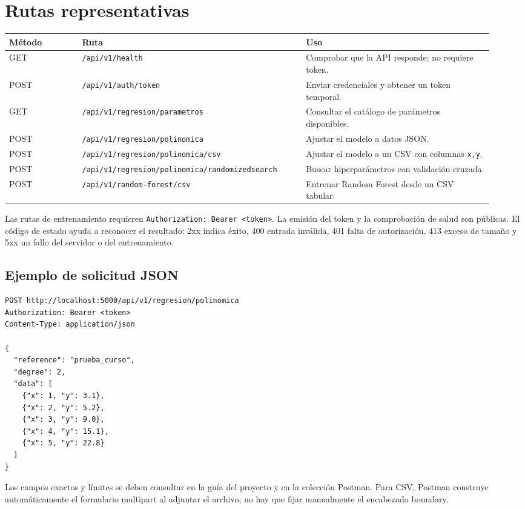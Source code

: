 \documentclass[11pt,a4paper]{article}
\begin{document}
\section{Rutas representativas}
\begin{longtable}{p{0.14\linewidth}p{0.43\linewidth}p{0.36\linewidth}}
\toprule Método & Ruta & Uso\\\midrule
GET & \texttt{/api/v1/health} & Comprobar que la API responde; no requiere token.\\
POST & \texttt{/api/v1/auth/token} & Enviar credenciales y obtener un token temporal.\\
GET & \texttt{/api/v1/regresion/parametros} & Consultar el catálogo de parámetros disponibles.\\
POST & \texttt{/api/v1/regresion/polinomica} & Ajustar el modelo a datos JSON.\\
POST & \texttt{/api/v1/regresion/polinomica/csv} & Ajustar el modelo a un CSV con columnas \texttt{x,y}.\\
POST & \texttt{/api/v1/regresion/polinomica/randomizedsearch} & Buscar hiperparámetros con validación cruzada.\\
POST & \texttt{/api/v1/random-forest/csv} & Entrenar Random Forest desde un CSV tabular.\\
\bottomrule
\end{longtable}
Las rutas de entrenamiento requieren \texttt{Authorization: Bearer <token>}. La emisión del token y la comprobación de salud son públicas. El código de estado ayuda a reconocer el resultado: 2xx indica éxito, 400 entrada inválida, 401 falta de autorización, 413 exceso de tamaño y 5xx un fallo del servidor o del entrenamiento.

\subsection{Ejemplo de solicitud JSON}
\begin{lstlisting}
POST http://localhost:5000/api/v1/regresion/polinomica
Authorization: Bearer <token>
Content-Type: application/json

{
  "reference": "prueba_curso",
  "degree": 2,
  "data": [
    {"x": 1, "y": 3.1},
    {"x": 2, "y": 5.2},
    {"x": 3, "y": 9.0},
    {"x": 4, "y": 15.1},
    {"x": 5, "y": 22.8}
  ]
}
\end{lstlisting}
Los campos exactos y límites se deben consultar en la guía del proyecto y en la colección Postman. Para CSV, Postman construye automáticamente el formulario multipart al adjuntar el archivo; no hay que fijar manualmente el encabezado boundary.
\end{document}

